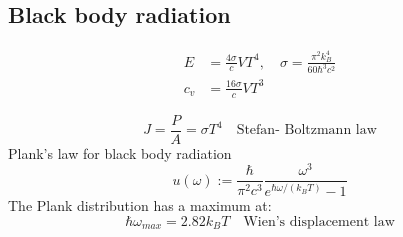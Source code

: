 \subsection*{Black body radiation}

\begin{equation*}
    \begin{aligned}
        E &= \frac{4 \sigma}{c} V T^4 , \quad \sigma = \frac{\pi^2 k_B^4}{60 \hbar^3 c^2} \\
        c_v &= \frac{16 \sigma}{c} V T^3
    \end{aligned}
\end{equation*}

\begin{equation*}
    J = \frac{P}{A} = \sigma T^4 \quad \text{Stefan- Boltzmann law}
\end{equation*}
Plank's law for black body radiation
\begin{equation*}
    u(\omega) := \frac{\hbar}{\pi^2 c^3} \frac{\omega^3}{e^{\hbar\omega/(k_BT)}-1}
\end{equation*}
The Plank distribution has a maximum at:
\begin{equation*}
    \hbar \omega_{max} = 2.82 k_B T \quad \text{Wien's displacement law}
\end{equation*}